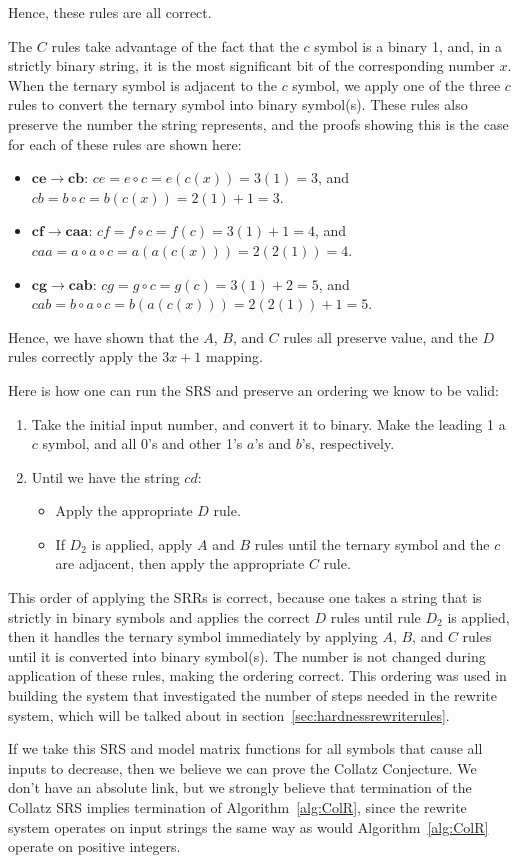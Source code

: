 Hence, these rules are all correct. \par
The $C$ rules take advantage of the fact that the $c$ symbol is a binary 1, and, in a strictly binary string, it is the most significant bit of the corresponding number $x$. When the ternary symbol is adjacent to the $c$ symbol, we apply one of the three $c$ rules to convert the ternary symbol into binary symbol(s). These rules also preserve the number the string represents, and the proofs showing this is the case for each of these rules are shown here:
\begin{itemize}
    \item $\boldsymbol{ce \rightarrow cb}$: $ce = e \circ c = e(c(x)) = 3(1) = 3$, and $cb = b
    \circ c = b(c(x)) = 2(1)+1 = 3$.
    \item $\boldsymbol{cf \rightarrow caa}$: $cf = f \circ c = f(c) = 3(1)+ 1 = 4$, and $caa = a \circ a \circ c = a(a(c(x))) = 2(2(1)) = 4$.
    \item $\boldsymbol{cg \rightarrow cab}$: $cg = g \circ c = g(c) = 3(1)+ 2 = 5$, and $cab = b \circ a \circ c = b(a(c(x))) = 2(2(1))+1 = 5$.
\end{itemize}
Hence, we have shown that the $A$, $B$, and $C$ rules all preserve value, and the $D$ rules correctly apply the $3x+1$ mapping. \par
Here is how one can run the SRS and preserve an ordering we know to be valid:
\begin{enumerate}
    \item Take the initial input number, and convert it to binary. Make the leading 1 a $c$ symbol, and all 0's and other 1's $a$'s and $b$'s, respectively.
    \item Until we have the string $cd$: 
    \begin{itemize}
        \item Apply the appropriate $D$ rule.
        \item If $D_2$ is applied, apply $A$ and $B$ rules until the ternary symbol and the $c$ are adjacent, then apply the appropriate $C$ rule.
    \end{itemize}
\end{enumerate}
This order of applying the SRRs is correct, because one takes a string that is strictly in binary symbols and applies the correct $D$ rules until rule $D_2$ is applied, then it handles the ternary symbol immediately by applying $A$, $B$, and $C$ rules until it is converted into binary symbol(s). The number is not changed during application of these rules, making the ordering correct. This ordering was used in building the system that investigated the number of steps needed in the rewrite system, which will be talked about in section~\ref{sec:hardnessrewriterules}. \par
If we take this SRS and model matrix functions for all symbols that cause all inputs to decrease, then we believe we can prove the Collatz Conjecture. We don't have an absolute link, but we strongly believe that termination of the Collatz SRS implies termination of Algorithm~\ref{alg:ColR}, since the rewrite system operates on input strings the same way as would Algorithm~\ref{alg:ColR} operate on positive integers.
